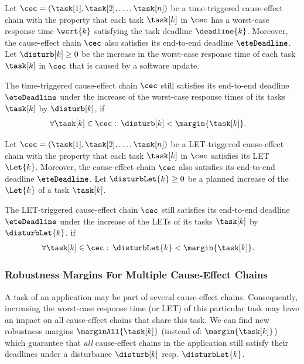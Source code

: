 \begin{tcolorbox}[colback=black!5!white,colframe=black!75!black, breakable, 
title= \textbf{Theorem}: Robustness test for a single time-triggered cause-effect chain]
Let $\cec = (\task[1], \task[2], \ldots, \task[n])$ be a time-triggered cause-effect chain with the property that each task $\task[k]$ in $\cec$ has a worst-case response time $\wcrt{k}$ satisfying the task deadline $\deadline{k}$. 
Moreover, the cause-effect chain $\cec$ also satisfies its end-to-end deadline $\eteDeadline$.
Let $\disturb[k] \geq 0$ be the increase in the worst-case response time of each task $\task[k]$ in $\cec$ that is caused by a software update.
\smallskip

The time-triggered cause-effect chain $\cec$ still satisfies its end-to-end deadline $\eteDeadline$ under the increase of the worst-case response times of its tasks $\task[k]$ by $\disturb[k]$, if  
\begin{align*}
	& \forall \task[k] \in \cec: \:
	\disturb[k] < \margin{\task[k]} .
\end{align*}	
\end{tcolorbox}
\smallskip

\begin{tcolorbox}[colback=black!5!white,colframe=black!75!black, breakable, 
title= \textbf{Theorem}: Robustness test for a single LET-triggered cause-effect chain]
Let $\cec = (\task[1], \task[2], \ldots, \task[n])$ be a LET-triggered cause-effect chain with the property that each task $\task[k]$ in $\cec$ satisfies its LET $\Let{k}$. 
Moreover, the cause-effect chain $\cec$ also satisfies its end-to-end deadline $\eteDeadline$.
Let $\disturbLet{k} \geq 0$ be a planned increase of the $\Let{k}$ of a task $\task[k]$.
\smallskip

The LET-triggered cause-effect chain $\cec$ still satisfies its end-to-end deadline $\eteDeadline$ under the increase of the LETs of its tasks $\task[k]$ by $\disturbLet{k}$, if  
\begin{align*}
	& \forall \task[k] \in \cec: \:
	\disturbLet{k} < \margin{\task[k]}. 
\end{align*}	
\end{tcolorbox}
\bigskip


\subsubsection{Robustness Margins For Multiple Cause-Effect Chains}
A task of an application may be part of several cause-effect chains.
Consequently, increasing the worst-case response time (or LET) of this particular task may have an impact on all cause-effect chains that share this task.
We can find new robustness margins $\marginAll{\task[k]}$ (instead of: $\margin{\task[k]}$) which guarantee that \emph{all} cause-effect chains in the application still satisfy their deadlines under a disturbance $\disturb[k]$ resp. $\disturbLet{k}$.
\bigskip

